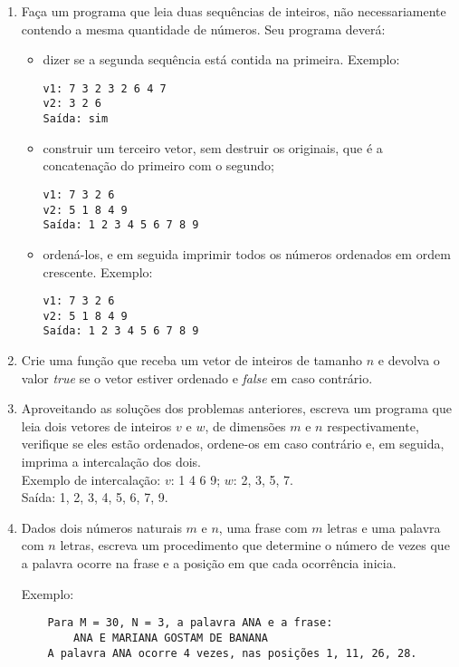 \begin{enumerate}
\item Faça  um  programa  que   leia  duas  sequências  de  inteiros,  não
necessariamente  contendo a  mesma quantidade  de números. Seu programa
deverá:
\begin{itemize} 
\item dizer  se a segunda sequência está contida na primeira. Exemplo:
\begin{verbatim}
v1: 7 3 2 3 2 6 4 7 
v2: 3 2 6
Saída: sim
\end{verbatim}
\item construir um terceiro  vetor, sem  destruir os  originais, que é  
      a concatenação  do primeiro com o segundo;
\begin{verbatim}
v1: 7 3 2 6
v2: 5 1 8 4 9
Saída: 1 2 3 4 5 6 7 8 9
\end{verbatim}
\item ordená-los, e em seguida imprimir todos os números ordenados 
      em ordem crescente. Exemplo:
\begin{verbatim}
v1: 7 3 2 6
v2: 5 1 8 4 9
Saída: 1 2 3 4 5 6 7 8 9
\end{verbatim}
\end{itemize}

\item Crie uma função que receba um vetor de inteiros de 
     tamanho $n$ e devolva o valor \emph{true} se o vetor estiver ordenado e 
     \emph{false} em caso contrário.

\item Aproveitando as soluções dos problemas anteriores, escreva um programa
     que leia dois vetores de inteiros $v$ e $w$, 
     de dimensões $m$ e $n$ 
     respectivamente, verifique se eles estão ordenados, ordene-os em caso 
     contrário e, em seguida, imprima a intercalação dos dois. \\
     Exemplo de intercalação: $v$: 1 4 6 9; $w$: 2, 3, 5, 7. \\
     Saída: 1, 2, 3, 4, 5, 6, 7, 9. 

\item Dados dois números naturais $m$ e $n$, uma frase com $m$ letras
e uma palavra com $n$ letras, escreva um procedimento que determine o número de
vezes que a palavra ocorre na frase e a posição em que cada ocorrência inicia.

    Exemplo:
    \begin{verbatim}
    Para M = 30, N = 3, a palavra ANA e a frase:
        ANA E MARIANA GOSTAM DE BANANA
    A palavra ANA ocorre 4 vezes, nas posições 1, 11, 26, 28.
    \end{verbatim}


\end{enumerate}
